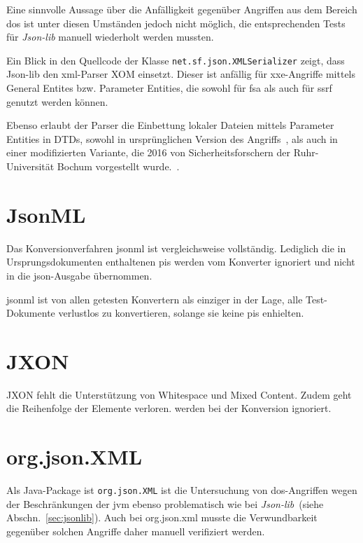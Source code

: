 Eine sinnvolle Aussage über die Anfälligkeit gegenüber Angriffen aus dem Bereich \acrlong{dos} ist unter diesen Umständen jedoch nicht möglich, die entsprechenden Tests für \emph{Json-lib} manuell wiederholt werden mussten.

Ein Blick in den Quellcode der Klasse \texttt{net.sf.json.XMLSerializer} zeigt, dass Json-lib den \acrshort{xml}-Parser XOM einsetzt. Dieser ist anfällig für \acrshort{xxe}-Angriffe mittels General Entites bzw. Parameter Entities, die sowohl für \acrlong{fsa} als auch für \acrlong{ssrf} genutzt werden können.

Ebenso erlaubt der Parser die Einbettung lokaler Dateien mittels Parameter Entities in DTDs, sowohl in ursprünglichen Version des Angriffs~\cite[S.~10]{morgan2014xml}, als auch in einer modifizierten Variante, die 2016 von Sicherheitsforschern der Ruhr-Universität Bochum vorgestellt wurde.~\cite[Abschn.~5.2]{spaeth2016sok}.

\section{JsonML}
\label{sec:jsonml}

Das Konversionverfahren \acrshort{jsonml} ist vergleichsweise vollständig. Lediglich die in Ursprungsdokumenten enthaltenen \glspl{pi} werden vom Konverter ignoriert und nicht in die \acrshort{json}-Ausgabe übernommen.

\acrshort{jsonml} ist von allen getesten Konvertern als einziger in der Lage, alle Test-Dokumente verlustlos zu konvertieren, solange sie keine \glspl{pi} enhielten.

\section{JXON}
\label{sec:jxon}

JXON fehlt die Unterstützung von Whitespace und Mixed Content. Zudem geht die Reihenfolge der Elemente verloren.  werden bei der Konversion ignoriert.

\section{org.json.XML}
\label{sec:orgjsonxml}

Als Java-Package ist \texttt{org.json.XML} ist die Untersuchung von \acrshort{dos}-Angriffen wegen der Beschränkungen der \acrlong{jvm} ebenso problematisch wie bei \emph{Json-lib}~(siehe Abschn.~\ref{sec:jsonlib}). Auch bei org.json.\acrshort{xml} musste die Verwundbarkeit gegenüber solchen Angriffe daher manuell verifiziert werden.

